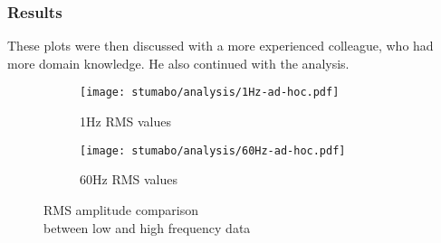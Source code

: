 \begin{frame}
    \frametitle{Results}
    \vspace*{\fill}
    These plots were then discussed with a more experienced colleague, who had more domain knowledge.
    He also continued with the analysis.
    \begin{figure}[htp]
        \begin{subfigure}{.495\textwidth}
            \texttt{[image: stumabo/analysis/1Hz-ad-hoc.pdf]}
            \caption{1Hz RMS values}
            \label{fig:stu_1Hz_rms}
        \end{subfigure}
        \begin{subfigure}{.495\textwidth}
            \texttt{[image: stumabo/analysis/60Hz-ad-hoc.pdf]}
            \caption{60Hz RMS values}
            \label{fig:stu_60Hz_rms}
        \end{subfigure}
        \caption{RMS amplitude comparison \\between low and high frequency data}
        \label{fig:stu_3_rms}
    \end{figure}

    \vspace*{\fill}
\end{frame}

